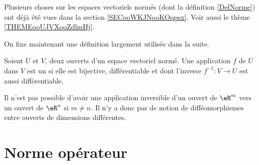 
Plusieurs choses sur les espaces vectoriels normés (dont la définition \ref{DefNorme}) ont déjà été vues dans la section \ref{SECooWKJNooKOqpsx}. Voir aussi le thème \ref{THEMEooUJVXooZdlmHj}.

On fixe maintenant une définition largement utilisée dans la suite.
\begin{definition}      \label{DefAQIQooYqZdya}
	 Soient $U$ et $V$, deux ouverts d'un espace vectoriel normé. Une application $f$ de $U$ dans $V$ est un  si elle est bijective, différentiable et dont l'inverse $f^{-1}:V\to U $ est aussi différentiable.
\end{definition}

\begin{remark}  %
	Il n'est pas possible d'avoir une application inversible d'un ouvert de $\eR^m$ vers un ouvert de $\eR^n$ si $m\neq n$. Il n'y a donc pas de notion de difféomorphismes entre ouverts de dimensions différentes.
\end{remark}

\section{Norme opérateur}

